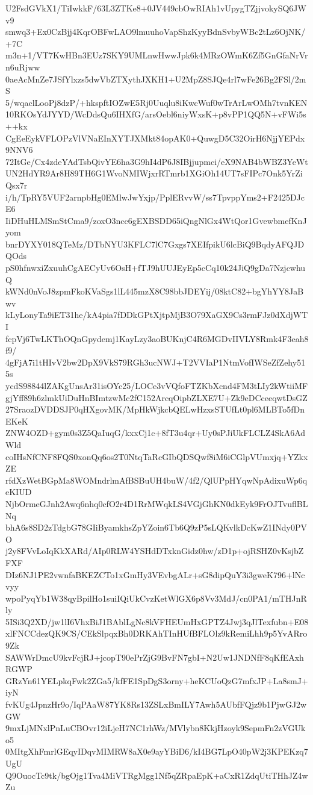 U2FsdGVkX1/TiIwkkF/63L3ZTKe8+0JV449cbOwRIAh1vUpygTZjjvokySQ6JWv9
smwq3+Ex0CzBjj4KqrOBFwLAO9lmuuhoVapShzKyyBdnSvbyWBc2tLz6OjNK/+7C
m3n+1/VT7KwHBn3EUz7SKY9UMLnwHwwJpk6k4MRzOWmK6Zf5GnGfaNrVrn6uRjww
0aeAcMnZe7JSfYlxzs5dwVbZTXythJXKH1+U2MpZ8SJQe4rl7wFe26Bg2FSl/2mS
5/wqaclLooPj8dzP/+hkspftIOZwE5Rj0Uuqlu8iKwcWuf0wTrArLwOMh7tvnKEN
10RKOsYdJYYD/WcDdsQu6IHXfG/arsOebl6niyWxsK+p8vPP1QQ5N+vFWi5s++kx
CgEeEykVFLOPzVlVNaEInXYTJXMkt84opAK0+QuwgD5C32OirH6NjjYEPdx9NNV6
72ItGe/Cx4zdeYAdTsbQivYE6ha3G9hI4dP6J8IBjjupmci/eX9NAB4bWBZ3YeWt
UN2HdYR9Ar8H89TH6G1WvoNMIWjxrRTmrb1XGiOh14UT7sFIPc7Onk5YrZiQsx7r
i/h/TpRY5VUF2arnpbHg0EMlwJwYxjp/PplERvvW/ss7TpvppYms2+F2425DJcE6
IiDHuHLMSmStCma9/zoxO3ncc6gEXBSDD65iQngNlGx4WtQor1GvewbmefKnJyom
bnrDYXY018QTeMz/DTbNYU3KFLC7lC7Gxgs7XEIfpikU6lcBiQ9BqdyAFQJDQOds
pS0hfnwxiZxuuhCgAECyUv6OsH+fTJ9hUUJEyEp5cCq10k24JiQ9gDa7NzjcwhuQ
kWNd0nVoJ8zpmFkoKVaSgs1lL445mzX8C98bbJDEYij/08ktC82+bgYhYY8JaBwv
kLyLonyTa9iET31he/kA4pia7fDDkGPtXjtpMjB3O79XaGX9Cs3rmFJz0dXdjWTI
fcpVj6TwLKThOQnGpydemj1KayLzy3aoBUKnjC4R6MGDvIIVLY8Rmk4F3eah8f9/
4gFjA7i1tHIvV2bw2DpX9VkS79RGh3ucNWJ+T2VVIaP1NtmVofIWSeZfZehy515s
ycdS98844lZAKgUnsAr31isOYc25/LOCe3vVQfoFTZKbXcnd4FM3tLIy2kWtiiMF
gjYff89h6zlmkUiDuHnBImtzwMc2fC152ArcqOipbZLXE7U+Zk9eDCceeqwtDsGZ
27SraozDVDDSJP0qHXgovMK/MpHkWjkcbQELwHzxsSTUfLt0pl6MLBTo5fDnEKeK
ZNW4OZD+gym0s3Z5QaIuqG/kxxCj1c+8fT3u4qr+Uy0sPJiUkFLCLZ4SkA6AdWld
coIHsNfCNF8FQS0xonQq6os2T0NtqTaRcGIbQDSQwf8iM6iCGlpVUmxjq+YZkxZE
rfdXzWetBGpMa8WOMndrlmAfBSBuUH4buW/4f2/QlUPpHYqwNpAdixuWp6qeKIUD
NjbOrmeGJnh2Awq6nhq0cfO2r4D1RrMWqkLS4VGjGhKN0dkEyk9FrOJTvuflBLNq
bhA6s8SD2zTdgbG78GIiByamkhsZpYZoin6Tb6Q9zP5sLQKvlkDcKwZ1INdy0PVO
j2y8FVvLoIqKkXARd/AIp0RLW4YSHdDTxknGidz0hw/zD1p+ojRSHZ0vKsjbZFXF
DIz6NJ1PE2vwnfaBKEZCTo1xGmHy3VEvbgALr+sG8dipQuY3i3gweK796+lNcvyy
wpoPyqYb1W38qyBpilHo1suiIQiUkCvzKetWlGX6p8Vv3MdJ/cn0PA1/mTHJnRly
5ISi3Q2XD/jw1lI6VhxBiJ1BAblLgNc8kVFHEUmHxGPTZ4Jwj3qJlTexfubn+E08
xlFNCCdezQK9CS/CEkSlpqxBh0DRKAhTInHUfBFLOlz9kRemiLhh9p5YvARro9Zk
SAWWrDmcU9kvFcjRJ+jcopT90ePrZjG9BvFN7gbI+N2Uw1JNDNfF8qKfEAxhRGWP
GRzYn61YELpkqFwk2ZGa5/kfFE1SpDgS3orny+heKCUoQzG7mfxJP+La8smJ+iyN
fvKUg4JpnzHr9o/IqPAaW87YK8Rs13ZSLxBmILY7Awh5AUbfFQjz9b1PjwGJ2wGW
9mxLjMNxlPnLuCBOvr12iLjeH7NC1rhWz/MVlybn8KkjHzoyk9SepmFn2zVGUko5
0MItgXhFmrlGEqyIDqvMIMRW8aX0e9ayYBiD6/kI4BG7LpO40pW2j3KPEKzq7UgU
Q9OuocTc9tk/bgOjg1Tva4MiVTRgMgg1Nf5qZRpaEpK+aCxR1ZdqUtiTHhJZ4wZu
